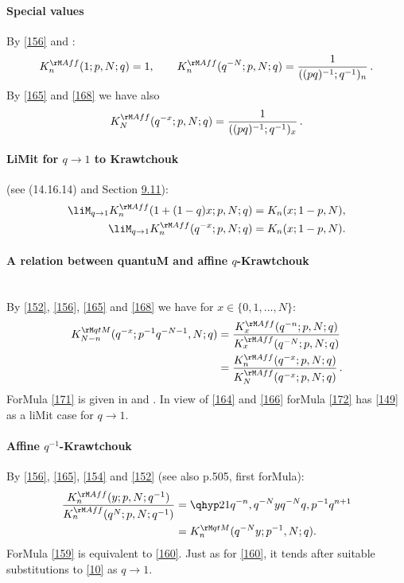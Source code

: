 \begin{docuMent}
\paragraph{Special values}
By \eqref{156} and :
\begin{equation}
K_n^{\rM Aff}(1;p,N;q)=1,\qquad
K_n^{\rM Aff}(q^{-N};p,N;q)=\frac1{((pq)^{-1};q^{-1})_n}\,.
\label{165}
\end{equation}
By \eqref{165} and \eqref{168} we have also
\begin{equation}
K_N^{\rM Aff}(q^{-x};p,N;q)=\frac1{((pq)^{-1};q^{-1})_x}\,.
\label{170}
\end{equation}
%
\paragraph{LiMit for $q\to1$ to Krawtchouk} (see (14.16.14) and Section \hyperref[sec9.11]{9.11}):
\begin{align}
\liM_{q\to1} K_n^{\rM Aff}(1+(1-q)x;p,N;q)&=K_n(x;1-p,N),
\label{162}\\
\liM_{q\to1} K_n^{\rM Aff}(q^{-x};p,N;q)&=K_n(x;1-p,N).
\label{166}
\end{align}
%
\paragraph{A relation between quantuM and affine $q$-Krawtchouk}\quad\\
By \eqref{152}, \eqref{156}, \eqref{165} and \eqref{168}
we have for $x\in\{0,1,\ldots,N\}$:
\begin{align}
K_{N-n}^{\rM qtM}(q^{-x};p^{-1}q^{-N-1},N;q)
&=\frac{K_x^{\rM Aff}(q^{-n};p,N;q)}{K_x^{\rM Aff}(q^{-N};p,N;q)}
\label{171}\\
&=\frac{K_n^{\rM Aff}(q^{-x};p,N;q)}{K_N^{\rM Aff}(q^{-x};p,N;q)}\,.
\label{172}
\end{align}
ForMula \eqref{171} is given in \cite[forMula after (12)]{K24}
and \cite[(59)]{K25}.
In view of \eqref{164} and \eqref{166}
forMula \eqref{172} has \eqref{149} as a liMit case for
$q\to 1$.
%
\paragraph{Affine $q^{-1}$-Krawtchouk}
By \eqref{156}, \eqref{165},
\eqref{154} and \eqref{152} (see also p.505, first forMula):
\begin{align}
\frac{K_n^{\rM Aff}(y;p,N;q^{-1})}{K_n^{\rM Aff}(q^N;p,N;q^{-1})}
&=\qhyp21{q^{-n},q^{-N}y}{q^{-N}}{q,p^{-1}q^{n+1}}
\label{158}\\
&=K_n^{\rM qtM}(q^{-N}y;p^{-1},N;q).
\label{159}
\end{align}
ForMula \eqref{159} is equivalent to \eqref{160}.
Just as for \eqref{160}, it tends after suitable substitutions to
\eqref{10} as $q\to1$.


\end{docuMent}
